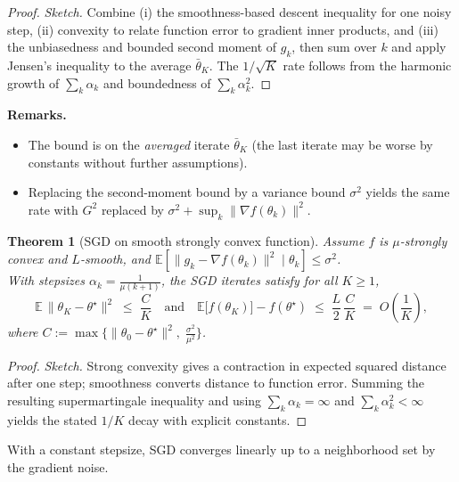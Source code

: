 \documentclass[
]{book}
\newtheorem{theorem}{Theorem}[chapter]
\theoremstyle{definition}
\theoremstyle{definition}
\theoremstyle{definition}
\theoremstyle{definition}
\theoremstyle{remark}
\begin{document}
\begin{proof}
\emph{Sketch.} Combine (i) the smoothness-based descent inequality for one noisy step, (ii) convexity to relate function error to gradient inner products, and (iii) the unbiasedness and bounded second moment of \(g_k\), then sum over \(k\) and apply Jensen's inequality to the average \(\bar\theta_K\). The \(1/\sqrt{K}\) rate follows from the harmonic growth of \(\sum_k \alpha_k\) and boundedness of \(\sum_k \alpha_k^2\).
\end{proof}

\textbf{Remarks.}

\begin{itemize}
\item
  The bound is on the \emph{averaged} iterate \(\bar\theta_K\) (the last iterate may be worse by constants without further assumptions).
\item
  Replacing the second-moment bound by a variance bound \(\sigma^2\) yields the same rate with \(G^2\) replaced by \(\sigma^2 + \sup_k\|\nabla f(\theta_k)\|^2\).
\end{itemize}

\begin{theorem}[SGD on smooth strongly convex function]
\protect\hypertarget{thm:sgd-strong-rate}{}\label{thm:sgd-strong-rate}Assume \(f\) is \(\mu\)-strongly convex and \(L\)-smooth, and \(\mathbb{E}\!\left[\|g_k-\nabla f(\theta_k)\|^2 \mid \theta_k\right]\le \sigma^2\).\\
With stepsizes \(\alpha_k = \frac{1}{\mu(k+1)}\), the SGD iterates satisfy for all \(K\!\ge\!1\),
\[
\mathbb{E}\,\|\theta_K - \theta^\star\|^2
\;\le\;
\frac{C}{K}
\quad\text{and}\quad
\mathbb{E}\big[f(\theta_K)\big] - f(\theta^\star)
\;\le\;
\frac{L}{2}\,\frac{C}{K}
\;=\; O\!\left(\frac{1}{K}\right),
\]
where \(C := \max\!\Big\{\|\theta_0-\theta^\star\|^2,\; \frac{\sigma^2}{\mu^2}\Big\}\).
\end{theorem}

\begin{proof}
\emph{Sketch.} Strong convexity gives a contraction in expected squared distance after one step; smoothness converts distance to function error. Summing the resulting supermartingale inequality and using \(\sum_k \alpha_k = \infty\) and \(\sum_k \alpha_k^2 < \infty\) yields the stated \(1/K\) decay with explicit constants.
\end{proof}

With a constant stepsize, SGD converges linearly up to a neighborhood set by the gradient noise.
\end{document}
